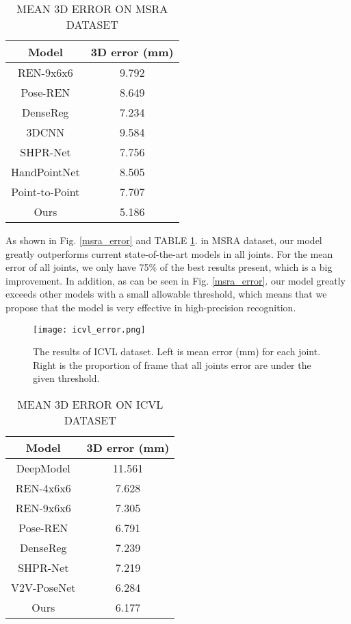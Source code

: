\documentclass[journal]{IEEEtran}
\begin{document}
\begin{table}[!t]
\renewcommand{\arraystretch}{1.3}
  \caption{MEAN 3D ERROR ON MSRA DATASET}
  \label{msra_table}
  \centering
    \begin{tabular}{c c}
    \toprule
    Model & 3D error (mm)\\
    \hline
    REN-9x6x6\cite{wang2018region} & 9.792\\
    Pose-REN\cite{chen2017pose} & 8.649\\
    DenseReg\cite{wan2018dense} & 7.234\\
    3DCNN\cite{ge20173d} & 9.584\\
    SHPR-Net\cite{chen2018shpr} & 7.756\\
    HandPointNet\cite{ge2018hand} & 8.505\\
    Point-to-Point\cite{ge2018point} & 7.707\\
    \hline
    Ours & 5.186\\
    \bottomrule
    \end{tabular}
\end{table}

As shown in Fig\@. \ref{msra_error} and TABLE \ref{msra_table}. 
in MSRA dataset, our model greatly outperforms current state-of-the-art models in all joints. 
For the mean error of all joints, we only have 75\% of the best results present\cite{wan2018dense}, which is a big improvement. 
In addition, as can be seen in Fig\@. \ref{msra_error}.  our model greatly exceeds other models with a small allowable threshold, 
which means that we propose that the model is very effective in high-precision recognition.

\begin{figure*}[!t]
  \centering
  \texttt{[image: icvl\_error.png]}
  \caption{
    The results of ICVL dataset. 
    Left is mean error (mm) for each joint. 
    Right is the proportion of frame that all joints error are under the given threshold.
  }
  \label{icvl_error}
\end{figure*}

\begin{table}[!t]
\renewcommand{\arraystretch}{1.3}
  \caption{MEAN 3D ERROR ON ICVL DATASET}
  \label{icvl_table}
  \centering
    \begin{tabular}{c c}
    \toprule
    Model & 3D error (mm)\\
    \hline
    DeepModel\cite{zhou2016model} & 11.561\\
    REN-4x6x6\cite{guo2017region} & 7.628\\
    REN-9x6x6\cite{wang2018region} & 7.305\\
    Pose-REN\cite{chen2017pose} & 6.791\\
    DenseReg\cite{wan2018dense} & 7.239\\
    SHPR-Net\cite{chen2018shpr} & 7.219\\
    V2V-PoseNet\cite{chang2018v2v} & 6.284\\
    \hline
    Ours & 6.177\\
    \bottomrule
    \end{tabular}
\end{table}
\end{document}

